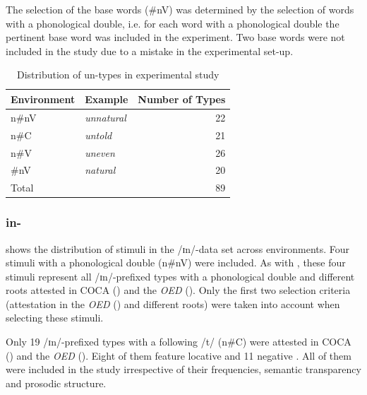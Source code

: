 The selection of the base words ({\#nV}) was determined by the selection of words with a phonological double, i.e.  for each word with a phonological double the pertinent base word was included in the experiment. Two base words were not included in the study due to a mistake in the experimental set-up. 





\begin{table}
	\caption{Distribution of  {un}-types in experimental study}
	\label{tbl:distribution of un types in experiment}

	
		\begin{tabular} {llr}

			Environment & Example & Number of  Types\\

			\midrule
			n\#nV&\color[HTML]{3166FF}\textit{unnatural} & 22\\ 
			n\#C&\color[HTML]{3166FF}\textit{untold} & 21\\ 
			n\#V&\color[HTML]{3166FF}\textit{uneven} & 26 \\
			\#nV&\color[HTML]{3166FF}\textit{natural} & 20 \\ 
			\midrule
			Total&  & 89 \\ 
			\midrule

		\end{tabular}
		

	
\end{table}



\subsubsection{in-}

 shows the distribution of  stimuli in the /ɪn/-data set across environments. 
Four stimuli with a phonological double ({n\#nV}) were included. As with , these four stimuli represent all /ɪn/-prefixed types with a phonological double and different roots attested in COCA (\citealt{Davies.20082014}) and the \textit{OED} (\citealt{OED.2013}). Only the first two selection criteria (attestation in the \textit{OED} (\citealt{OED.2013}) and different roots) were taken into account when selecting these stimuli. 

\clearpage

Only 19 /ɪn/-prefixed types with a following /t/ ({n\#C}) were attested  in COCA (\citealt{Davies.20082014}) and the \textit{OED} (\citealt{OED.2013}).  Eight of them feature locative  and 11 negative . All of them were included in the study irrespective of their frequencies, semantic transparency and prosodic structure. 


